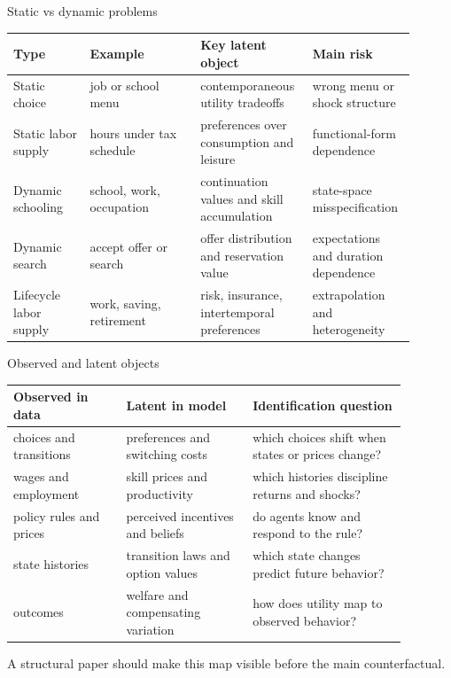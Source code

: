 \documentclass[aspectratio=169,11pt]{beamer}
\newcommand{\1}{\mathbf{1}}
\begin{document}
\begin{frame}{Static vs dynamic problems}
\small
\begin{tabular}{p{0.18\linewidth} p{0.26\linewidth} p{0.25\linewidth} p{0.21\linewidth}}
\toprule
Type & Example & Key latent object & Main risk \\
\midrule
Static choice & job or school menu & contemporaneous utility tradeoffs & wrong menu or shock structure \\
Static labor supply & hours under tax schedule & preferences over consumption and leisure & functional-form dependence \\
Dynamic schooling & school, work, occupation & continuation values and skill accumulation & state-space misspecification \\
Dynamic search & accept offer or search & offer distribution and reservation value & expectations and duration dependence \\
Lifecycle labor supply & work, saving, retirement & risk, insurance, intertemporal preferences & extrapolation and heterogeneity \\
\bottomrule
\end{tabular}
\end{frame}

\begin{frame}{Observed and latent objects}
\small
\begin{tabular}{p{0.25\linewidth} p{0.29\linewidth} p{0.34\linewidth}}
\toprule
Observed in data & Latent in model & Identification question \\
\midrule
choices and transitions & preferences and switching costs & which choices shift when states or prices change? \\
wages and employment & skill prices and productivity & which histories discipline returns and shocks? \\
policy rules and prices & perceived incentives and beliefs & do agents know and respond to the rule? \\
state histories & transition laws and option values & which state changes predict future behavior? \\
outcomes & welfare and compensating variation & how does utility map to observed behavior? \\
\bottomrule
\end{tabular}

\medskip
A structural paper should make this map visible before the main counterfactual.
\end{frame}
\end{document}

